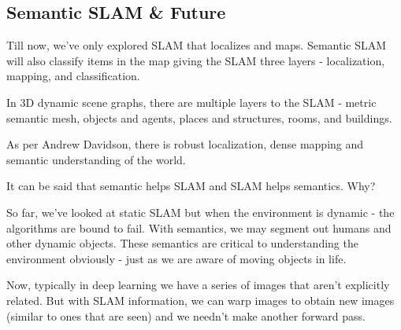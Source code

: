 \subsection*{Semantic SLAM \& Future}

Till now, we've only explored SLAM that localizes and maps. Semantic SLAM will also classify items in the map giving the SLAM three layers - localization, mapping, and classification.

In 3D dynamic scene graphs, there are multiple layers to the SLAM - metric semantic mesh, objects and agents, places and structures, rooms, and buildings.

As per Andrew Davidson, there is robust localization, dense mapping and semantic understanding of the world. 

It can be said that semantic helps SLAM and SLAM helps semantics. Why?

So far, we've looked at static SLAM but when the environment is dynamic - the algorithms are bound to fail. With semantics, we may segment out humans and other dynamic objects. These semantics are critical to understanding the environment obviously - just as we are aware of moving objects in life. 

Now, typically in deep learning we have a series of images that aren't explicitly related. But with SLAM information, we can warp images to obtain new images (similar to ones that are seen) and we needn't make another forward pass.